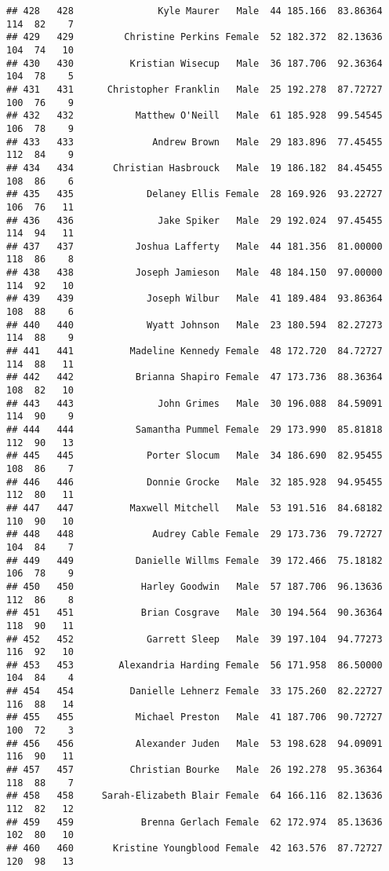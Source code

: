 \documentclass[
]{article}
\begin{document}
\begin{verbatim}
## 428   428               Kyle Maurer   Male  44 185.166  83.86364 114  82    7
## 429   429         Christine Perkins Female  52 182.372  82.13636 104  74   10
## 430   430          Kristian Wisecup   Male  36 187.706  92.36364 104  78    5
## 431   431      Christopher Franklin   Male  25 192.278  87.72727 100  76    9
## 432   432           Matthew O'Neill   Male  61 185.928  99.54545 106  78    9
## 433   433              Andrew Brown   Male  29 183.896  77.45455 112  84    9
## 434   434       Christian Hasbrouck   Male  19 186.182  84.45455 108  86    6
## 435   435             Delaney Ellis Female  28 169.926  93.22727 106  76   11
## 436   436               Jake Spiker   Male  29 192.024  97.45455 114  94   11
## 437   437           Joshua Lafferty   Male  44 181.356  81.00000 118  86    8
## 438   438           Joseph Jamieson   Male  48 184.150  97.00000 114  92   10
## 439   439             Joseph Wilbur   Male  41 189.484  93.86364 108  88    6
## 440   440             Wyatt Johnson   Male  23 180.594  82.27273 114  88    9
## 441   441          Madeline Kennedy Female  48 172.720  84.72727 114  88   11
## 442   442           Brianna Shapiro Female  47 173.736  88.36364 108  82   10
## 443   443               John Grimes   Male  30 196.088  84.59091 114  90    9
## 444   444           Samantha Pummel Female  29 173.990  85.81818 112  90   13
## 445   445             Porter Slocum   Male  34 186.690  82.95455 108  86    7
## 446   446             Donnie Grocke   Male  32 185.928  94.95455 112  80   11
## 447   447          Maxwell Mitchell   Male  53 191.516  84.68182 110  90   10
## 448   448              Audrey Cable Female  29 173.736  79.72727 104  84    7
## 449   449           Danielle Willms Female  39 172.466  75.18182 106  78    9
## 450   450            Harley Goodwin   Male  57 187.706  96.13636 112  86    8
## 451   451            Brian Cosgrave   Male  30 194.564  90.36364 118  90   11
## 452   452             Garrett Sleep   Male  39 197.104  94.77273 116  92   10
## 453   453        Alexandria Harding Female  56 171.958  86.50000 104  84    4
## 454   454          Danielle Lehnerz Female  33 175.260  82.22727 116  88   14
## 455   455           Michael Preston   Male  41 187.706  90.72727 100  72    3
## 456   456           Alexander Juden   Male  53 198.628  94.09091 116  90   11
## 457   457          Christian Bourke   Male  26 192.278  95.36364 118  88    7
## 458   458     Sarah-Elizabeth Blair Female  64 166.116  82.13636 112  82   12
## 459   459            Brenna Gerlach Female  62 172.974  85.13636 102  80   10
## 460   460       Kristine Youngblood Female  42 163.576  87.72727 120  98   13

\end{verbatim}
\end{document}

